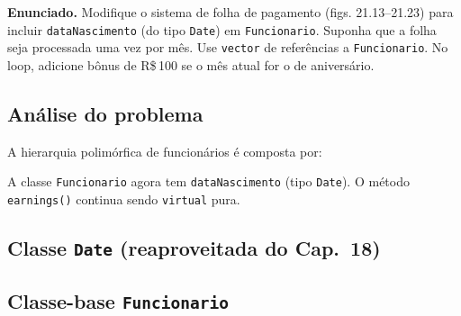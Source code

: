 \documentclass[11pt,a4paper]{article}
\begin{document}
\begin{enunciado}
\textbf{Enunciado.} Modifique o sistema de folha de pagamento (figs. 21.13--21.23) para incluir \texttt{dataNascimento} (do tipo \texttt{Date}) em \texttt{Funcionario}. Suponha que a folha seja processada uma vez por m\^es. Use \texttt{vector} de refer\^encias a \texttt{Funcionario}. No loop, adicione b\^onus de R\$\,100 se o m\^es atual for o de anivers\'ario.
\end{enunciado}

\subsection*{An\'alise do problema}

A hierarquia polim\'orfica de funcion\'arios \'e composta por:

\begin{center}
\end{center}

A classe \texttt{Funcionario} agora tem \texttt{dataNascimento} (tipo \texttt{Date}). O m\'etodo \texttt{earnings()} continua sendo \texttt{virtual} pura.

\subsection*{Classe \texttt{Date} (reaproveitada do Cap.~18)}



\subsection*{Classe-base \texttt{Funcionario}}



\end{document}
